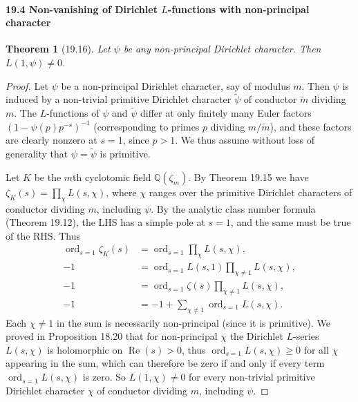 \documentclass[UTF8,11pt]{ctexart}
\newtheorem*{theorem}{Theorem}
\theoremstyle{definition}
\newcommand{\Q}{\mathbb Q}
\begin{document}
\paragraph{19.4 Non-vanishing of Dirichlet $L$-functions with non-principal character}
\begin{theorem}[19.16]
Let $\psi$ be any non-principal Dirichlet character. Then $L(1,\psi)\ne0$.
\end{theorem}
\begin{proof}
Let $\psi$ be a non-principal Dirichlet character, say of modulus $m$. Then $\psi$ is induced by a non-trivial primitive Dirichlet character $\widetilde\psi$ of conductor $\widetilde m$ dividing $m$. The $L$-functions of $\psi$ and $\widetilde\psi$ differ at only finitely many Euler factors $(1-\psi(p)p^{-s})^{-1}$ (corresponding to primes $p$ dividing $m/\widetilde m$), and these factors are clearly nonzero at $s=1$, since $p>1$. We thus assume without loss of generality that $\psi=\widetilde\psi$ is primitive.

Let $K$ be the $m$th cyclotomic field $\Q(\zeta_m)$. By Theorem 19.15 we have $\zeta_K(s)=\prod_\chi L(s,\chi)$, where $\chi$ ranges over the primitive Dirichlet characters of conductor dividing $m$, including $\psi$. By the analytic class number formula (Theorem 19.12), the LHS has a simple pole at $s=1$, and the same must be true of the RHS. Thus
\begin{align*}
\operatorname{ord}_{s=1}\zeta_K(s)&=\operatorname{ord}_{s=1}\prod_\chi L(s,\chi),\\
-1&=\operatorname{ord}_{s=1}L(s,1)\prod_{\chi\ne1}L(s,\chi),\\
-1&=\operatorname{ord}_{s=1}\zeta(s)\prod_{\chi\ne1}L(s,\chi),\\
-1&=-1+\sum_{\chi\ne1}\operatorname{ord}_{s=1}L(s,\chi).
\end{align*}
Each $\chi\ne1$ in the sum is necessarily non-principal (since it is primitive). We proved in Proposition 18.20 that for non-principal $\chi$ the Dirichlet $L$-series $L(s,\chi)$ is holomorphic on $\operatorname{Re}(s)>0$, thus $\operatorname{ord}_{s=1}L(s,\chi)\geq0$ for all $\chi$ appearing in the sum, which can therefore be zero if and only if every term $\operatorname{ord}_{s=1}L(s,\chi)$ is zero. So $L(1,\chi)\ne0$ for every non-trivial primitive Dirichlet character $\chi$ of conductor dividing $m$, including $\psi$.
\end{proof}
\end{document}
